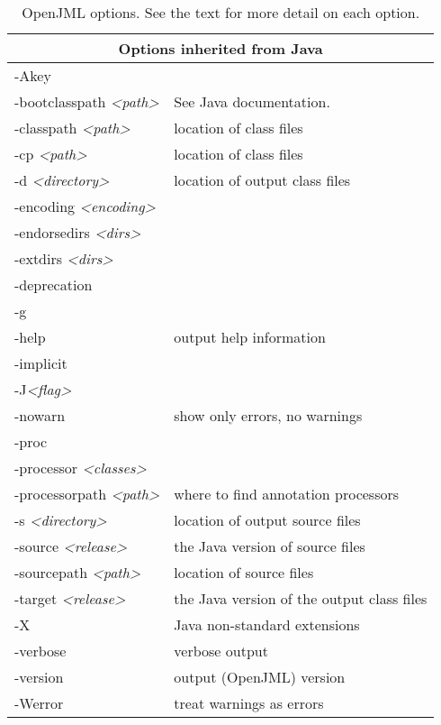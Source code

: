 \begin{table}
{\begin{tabular}{|l|p{1.4in}|}
\hline
\multicolumn{2}{|c|}{Options inherited from Java} \\
\hline
-Akey & \\ \hline
-bootclasspath {\it <path>}& See Java documentation. \\ \hline
-classpath {\it <path>}& location of class files \\ \hline
-cp {\it <path>}& location of class files\\ \hline
-d {\it <directory>} & location of output class files\\ \hline
-encoding {\it <encoding>} & \\ \hline
-endorsedirs {\it <dirs>} & \\ \hline
-extdirs {\it <dirs>} & \\ \hline
-deprecation & \\ \hline
-g & \\ \hline
-help & output help information\\ \hline
-implicit & \\ \hline
-J{\it <flag>} & \\ \hline
-nowarn & show only errors, no warnings \\ \hline
-proc & \\ \hline
-processor {\it <classes>} & \\ \hline
-processorpath {\it <path>} & where to find annotation processors\\ \hline
-s {\it <directory>} & location of output source files\\ \hline
-source {\it <release>} & the Java version of source files\\ \hline
-sourcepath {\it <path>} & location of source files\\ \hline
-target {\it <release>} & the Java version of the output class files\\ \hline
-X & Java non-standard extensions\\ \hline
-verbose & verbose output \\ \hline
-version & output (OpenJML) version\\ \hline
-Werror & treat warnings as errors \\ \hline

\end{tabular}
}
\caption{OpenJML options. See the text for more detail on each option.}
\label{Tab:Options}
\end{table}

